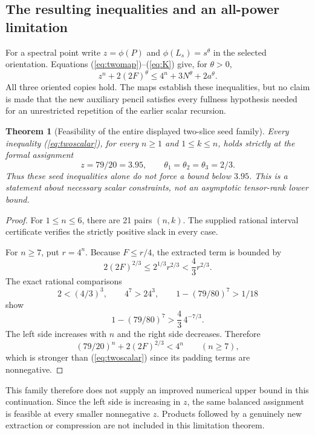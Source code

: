 \documentclass[11pt,letterpaper]{article}
\newtheorem{theorem}{Theorem}[section]
\theoremstyle{definition}\newtheorem{definition}[theorem]{Definition}
\theoremstyle{remark}\newtheorem{remark}[theorem]{Remark}
\begin{document}
\subsection{The resulting inequalities and an all-power limitation}
For a spectral point write $z=\phi(P)$ and $\phi(L_s)=s^\theta$ in the selected orientation. Equations (\ref{eq:twomap})--(\ref{eq:K}) give, for $\theta>0$,
\begin{equation}\label{eq:twoscalar}
z^n+2(2F)^\theta\leq4^n+3N^\theta+2a^\theta.
\end{equation}
All three oriented copies hold. The maps establish these inequalities, but no claim is made that the new auxiliary pencil satisfies every fullness hypothesis needed for an unrestricted repetition of the earlier scalar recursion.

\begin{theorem}[Feasibility of the entire displayed two-slice seed family]\label{thm:twobarrier}
Every inequality (\ref{eq:twoscalar}), for every $n\geq1$ and $1\leq k\leq n$, holds strictly at the formal assignment
\[
z=79/20=3.95,\qquad \theta_1=\theta_2=\theta_3=2/3.
\]
Thus these seed inequalities alone do not force a bound below $3.95$. This is a statement about necessary scalar constraints, not an asymptotic tensor-rank lower bound.
\end{theorem}
\begin{proof}
For $1\leq n\leq6$, there are 21 pairs $(n,k)$. The supplied rational interval certificate verifies the strictly positive slack in every case.

For $n\geq7$, put $r=4^n$. Because $F\leq r/4$, the extracted term is bounded by
\[
2(2F)^{2/3}\leq2^{1/3}r^{2/3}<\frac43r^{2/3}.
\]
The exact rational comparisons
\[
2<(4/3)^3,\qquad 4^7>24^3,\qquad
1-(79/80)^7>1/18
\]
show
\[
1-(79/80)^7>\frac43\,4^{-7/3}.
\]
The left side increases with $n$ and the right side decreases. Therefore
\[
(79/20)^n+2(2F)^{2/3}<4^n\qquad(n\geq7),
\]
which is stronger than (\ref{eq:twoscalar}) since its padding terms are nonnegative.
\end{proof}

This family therefore does not supply an improved numerical upper bound in this continuation. Since the left side is increasing in $z$, the same balanced assignment is feasible at every smaller nonnegative $z$. Products followed by a genuinely new extraction or compression are not included in this limitation theorem.
\end{document}
